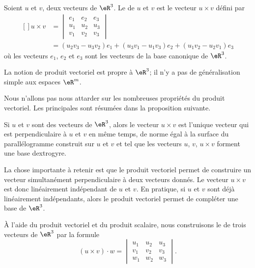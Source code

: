 \begin{definition}
	Soient $u$ et $v$, deux vecteurs de $\eR^3$. Le  de $u$ et $v$ est le vecteur $u\times v$ défini par 
	\begin{equation}
		\begin{aligned}[]
		u\times v&=\begin{vmatrix}
			e_1	&	e_2	&	e_3	\\
			u_1	&	u_2	&	u_3	\\
			v_1	&	v_2	&	v_3
		\end{vmatrix}\\
		&=
		(u_2v_3-u_3v_2)e_1+(u_3v_1-u_1v_3)e_2+(u_1v_2-u_2v_1)e_3
		\end{aligned}
	\end{equation}
	où les vecteurs $e_1$, $e_2$ et $e_3$ sont les vecteurs de la base canonique de $\eR^3$.
\end{definition}
La notion de produit vectoriel est propre à $\eR^3$; il n'y a pas de généralisation simple aux espaces $\eR^m$.

Nous n'allons pas nous attarder sur les nombreuses propriétés du produit vectoriel. Les principales sont résumées dans la proposition suivante.
\begin{proposition}
	Si $u$ et $v$ sont des vecteurs de $\eR^3$, alors le vecteur $u\times v$ est l'unique vecteur qui est perpendiculaire à $u$ et $v$ en même temps, de norme égal à la surface du parallélogramme construit sur $u$ et $v$ et tel que les vecteurs $u$, $v$, $u\times v$ forment une base dextrogyre.
\end{proposition}
La chose importante à retenir est que le produit vectoriel permet de construire un vecteur simultanément perpendiculaire à deux vecteurs donnés. Le vecteur $u\times v$ est donc linéairement indépendant de $u$ et $v$. En pratique, si $u$ et $v$ sont déjà linéairement indépendants, alors le produit vectoriel permet de compléter une base de $\eR^3$.

À l'aide du produit vectoriel et du produit scalaire, nous construisons le  de trois vecteurs de $\eR^3$ par la formule
\begin{equation}
	(u\times v)\cdot w=\begin{vmatrix}
			u_1	&	u_2	&	u_3	\\
			v_1	&	v_2	&	v_3	\\
			w_1	&	w_2	&	w_3	
	\end{vmatrix}.
\end{equation}

